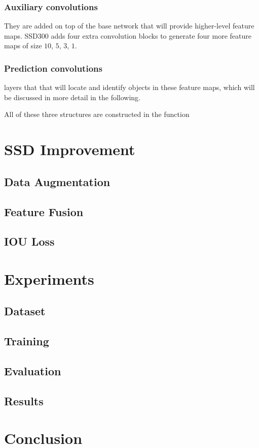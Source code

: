 \documentclass[journal,conference]{IEEEtran}
\begin{document}
\subsubsection{Auxiliary convolutions}
They are added on top of the base network that will provide higher-level feature maps. SSD300 adds four extra convolution blocks to generate four more feature maps of size $10$, $5$, $3$, $1$.

\subsubsection{Prediction convolutions} layers that that will locate and identify objects in these feature maps, which will be discussed in more detail in the following.


All of these three structures are constructed in the function 

\subsection{}



\section{SSD Improvement}
\subsection{Data Augmentation}

\subsection{Feature Fusion}



\subsection{IOU Loss}


\section{Experiments}
\subsection{Dataset}

\subsection{Training}

\subsection{Evaluation}

\subsection{Results}

\section{Conclusion}






\end{document}
